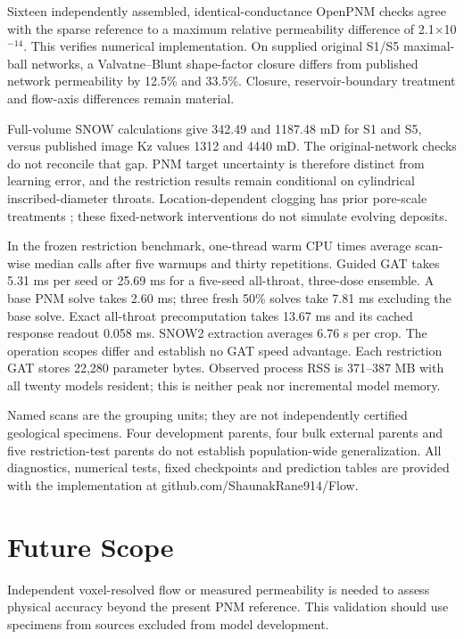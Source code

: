 \documentclass[a4paper]{svproc}
\begin{document}
Sixteen independently assembled, identical-conductance OpenPNM checks agree with the sparse reference to a maximum relative permeability difference of 2.1\ensuremath{\times}10\ensuremath{^{-14}}. This verifies numerical implementation. On supplied original S1/S5 maximal-ball networks, a Valvatne--Blunt shape-factor closure \cite{r17} differs from published network permeability by 12.5\% and 33.5\%. Closure, reservoir-boundary treatment and flow-axis differences remain material.

Full-volume SNOW calculations give 342.49 and 1187.48 mD for S1 and S5, versus published image Kz values 1312 and 4440 mD. The original-network checks do not reconcile that gap. PNM target uncertainty is therefore distinct from learning error, and the restriction results remain conditional on cylindrical inscribed-diameter throats. Location-dependent clogging has prior pore-scale treatments \cite{r18}; these fixed-network interventions do not simulate evolving deposits.

In the frozen restriction benchmark, one-thread warm CPU times average scan-wise median calls after five warmups and thirty repetitions. Guided GAT takes 5.31 ms per seed or 25.69 ms for a five-seed all-throat, three-dose ensemble. A base PNM solve takes 2.60 ms; three fresh 50\% solves take 7.81 ms excluding the base solve. Exact all-throat precomputation takes 13.67 ms and its cached response readout 0.058 ms. SNOW2 extraction averages 6.76 s per crop. The operation scopes differ and establish no GAT speed advantage. Each restriction GAT stores 22,280 parameter bytes. Observed process RSS is 371--387 MB with all twenty models resident; this is neither peak nor incremental model memory.

Named scans are the grouping units; they are not independently certified geological specimens. Four development parents, four bulk external parents and five restriction-test parents do not establish population-wide generalization. All diagnostics, numerical tests, fixed checkpoints and prediction tables are provided with the implementation at github.com/ShaunakRane914/Flow.

\section{Future Scope}

Independent voxel-resolved flow or measured permeability is needed to assess physical accuracy beyond the present PNM reference. This validation should use specimens from sources excluded from model development.
\end{document}
